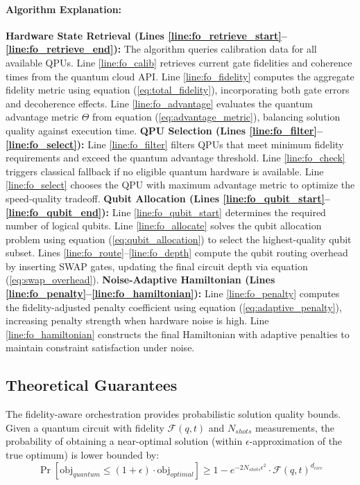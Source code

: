 \documentclass[lettersize,journal]{IEEEtran}
\begin{document}
\paragraph{Algorithm Explanation:}

\textbf{Hardware State Retrieval (Lines \ref{line:fo_retrieve_start}--\ref{line:fo_retrieve_end}):} The algorithm queries calibration data for all available QPUs. Line \ref{line:fo_calib} retrieves current gate fidelities and coherence times from the quantum cloud API. Line \ref{line:fo_fidelity} computes the aggregate fidelity metric using equation (\ref{eq:total_fidelity}), incorporating both gate errors and decoherence effects. Line \ref{line:fo_advantage} evaluates the quantum advantage metric $\Theta$ from equation (\ref{eq:advantage_metric}), balancing solution quality against execution time.
\textbf{QPU Selection (Lines \ref{line:fo_filter}--\ref{line:fo_select}):} Line \ref{line:fo_filter} filters QPUs that meet minimum fidelity requirements and exceed the quantum advantage threshold. Line \ref{line:fo_check} triggers classical fallback if no eligible quantum hardware is available. Line \ref{line:fo_select} chooses the QPU with maximum advantage metric to optimize the speed-quality tradeoff.
\textbf{Qubit Allocation (Lines \ref{line:fo_qubit_start}--\ref{line:fo_qubit_end}):} Line \ref{line:fo_qubit_start} determines the required number of logical qubits. Line \ref{line:fo_allocate} solves the qubit allocation problem using equation (\ref{eq:qubit_allocation}) to select the highest-quality qubit subset. Lines \ref{line:fo_route}--\ref{line:fo_depth} compute the qubit routing overhead by inserting SWAP gates, updating the final circuit depth via equation (\ref{eq:swap_overhead}).
\textbf{Noise-Adaptive Hamiltonian (Lines \ref{line:fo_penalty}--\ref{line:fo_hamiltonian}):} Line \ref{line:fo_penalty} computes the fidelity-adjusted penalty coefficient using equation (\ref{eq:adaptive_penalty}), increasing penalty strength when hardware noise is high. Line \ref{line:fo_hamiltonian} constructs the final Hamiltonian with adaptive penalties to maintain constraint satisfaction under noise.

\subsection{Theoretical Guarantees}
\label{subsec:guarantees}

The fidelity-aware orchestration provides probabilistic solution quality bounds. Given a quantum circuit with fidelity $\mathcal{F}(q, t)$ and $N_{shots}$ measurements, the probability of obtaining a near-optimal solution (within $\epsilon$-approximation of the true optimum) is lower bounded by:
\begin{equation}
\Pr[\text{obj}_{quantum} \leq (1+\epsilon) \cdot \text{obj}_{optimal}] \geq 1 - e^{-2N_{shots}\epsilon^2} \cdot \mathcal{F}(q, t)^{d_{circ}}
\label{eq:quality_bound}
\end{equation}
\end{document}
